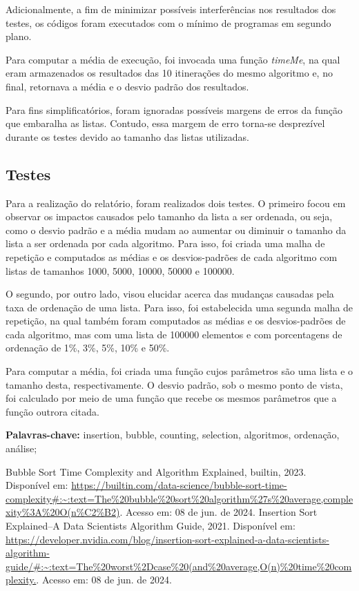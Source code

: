 \documentclass[10pt,a4paper]{article}
\begin{document}
Adicionalmente, a fim de minimizar possíveis interferências nos resultados dos testes, os códigos foram executados com o mínimo de programas em segundo plano. 

Para computar a média de execução, foi invocada uma função \textit{timeMe}, na qual eram armazenados os resultados das 10 itinerações do mesmo algoritmo e, no final, retornava a média e o desvio padrão dos resultados.

Para fins simplificatórios, foram ignoradas possíveis margens de erros da função que embaralha as listas. Contudo, essa margem de erro torna-se desprezível durante os testes devido ao tamanho das listas utilizadas.
\newpage
\subsection*{Testes}
    Para a realização do relatório, foram realizados dois testes. 
    O primeiro focou em observar os impactos causados pelo tamanho da lista a ser ordenada, ou seja, como o desvio padrão e a média mudam ao aumentar ou diminuir o tamanho da lista a ser ordenada por cada algoritmo. 
    Para isso, foi criada uma malha de repetição e computados as médias e os desvios-padrões de cada algoritmo com listas de tamanhos 1000, 5000, 10000, 50000 e 100000.
    
    O segundo, por outro lado, visou elucidar acerca das mudanças causadas pela taxa de ordenação de uma lista.
    Para isso, foi estabelecida uma segunda malha de repetição, na qual também foram computados as médias e os desvios-padrões de cada algoritmo, mas com uma lista de 100000 elementos e com porcentagens de ordenação de 1\%, 3\%, 5\%, 10\% e 50\%.
    

    Para computar a média, foi criada uma função cujos parâmetros são uma lista e o tamanho desta, respectivamente. O desvio padrão, sob o mesmo ponto de vista, foi calculado por meio de uma função que recebe os mesmos parâmetros que a função outrora citada.
    

\noindent\textbf{Palavras-chave:} insertion, bubble, counting, selection, algoritmos, ordenação, análise;

\newpage
\tableofcontents










\begin{thebibliography}{3}
    Bubble Sort Time Complexity and Algorithm Explained, builtin, 2023. Disponível em: \url{https://builtin.com/data-science/bubble-sort-time-complexity#:~:text=The%20bubble%20sort%20algorithm%27s%20average,complexity%3A%20O(n%C2%B2)}. Acesso em: 08 de jun. de 2024.
    Insertion Sort Explained–A Data Scientists Algorithm Guide, 2021. Disponível em: \url{https://developer.nvidia.com/blog/insertion-sort-explained-a-data-scientists-algorithm-guide/#:~:text=The%20worst%2Dcase%20(and%20average,O(n)%20time%20complexity.}. Acesso em: 08 de jun. de 2024.
\end{thebibliography}
\end{document}
